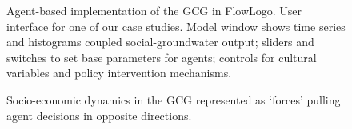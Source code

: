 \documentclass[12pt, a4paper]{article}
\begin{document}
\begin{figure}
	\caption{Agent-based implementation of the GCG in FlowLogo. User interface for one of our case studies. Model window shows time series and histograms coupled social-groundwater output; sliders and switches to set base parameters for agents; controls for cultural variables and policy intervention mechanisms.} \label{fig: CH3_GCG1_Implementation of the GCG in FlowLogo}
	\begin{center}
	\end{center}
\end{figure}

\begin{figure}
	\caption{Socio-economic dynamics in the GCG represented as ‘forces’ pulling agent decisions in opposite directions.}  \label{fig: CH3_GCG1_Socio-economic dynamics "forces"} 
	\begin{center}
	\end{center}
\end{figure}
\end{document}
